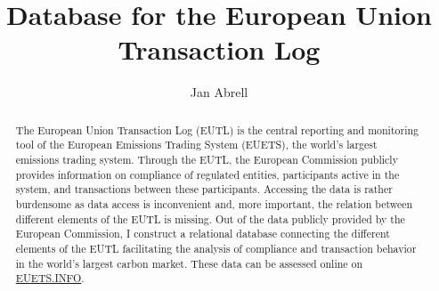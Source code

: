 \documentclass[authoryear]{elsarticle}
\begin{document}
\begin{frontmatter}
\title{Database for the European Union Transaction Log} 


\author{Jan Abrell}
\address[a]{euets.info@posteo.de\\ \today}

\begin{abstract}
	The European Union Transaction Log (EUTL) is the central reporting and monitoring tool of the European Emissions Trading System (EUETS), the world's largest emissions trading system. Through the EUTL, the European Commission publicly provides information on compliance of regulated entities, participants active in the system, and transactions between these participants. Accessing the data is rather burdensome as data access is inconvenient and, more important, the relation between different elements of the EUTL is missing. Out of the data publicly provided by the European Commission, I construct a relational database connecting the different elements of the EUTL facilitating the analysis of compliance and transaction behavior in the world's largest carbon market. These data can be assessed online on \href{https://www.euets.info}{EUETS.INFO}.
\end{abstract}





\end{frontmatter}

\end{document}
